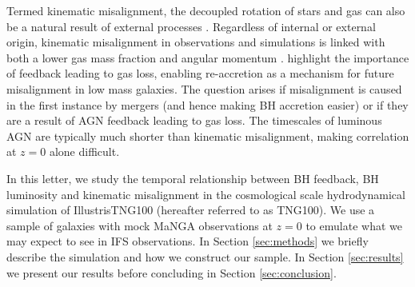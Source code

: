 \documentclass[fleqn,usenatbib]{mnras}
\newcommand{\red}[1]{{\textcolor{red}{#1}}}
\begin{document}
Termed kinematic misalignment, the decoupled rotation of stars and gas can also be a natural result of external processes \cite[e.g.][]{davis2011, barrera2015, vdvoort2015, jin2016, bryant2019, duckworth2019_halo}. Regardless of internal or external origin, kinematic misalignment in observations and simulations is linked with both a lower gas mass fraction and angular momentum \citep[][]{duckworth2019}. \citet{starkenburg+19} highlight the importance of feedback leading to gas loss, enabling re-accretion as a mechanism for future misalignment in low mass galaxies. The question arises if misalignment is caused in the first instance by mergers (and hence making BH accretion easier) or if they are a result of AGN feedback leading to gas loss. 
The timescales of luminous AGN are typically much shorter than kinematic misalignment, making correlation at $z=0$ alone difficult. 

In this letter, we study the temporal relationship between BH feedback, BH luminosity and kinematic misalignment in the cosmological scale hydrodynamical simulation of IllustrisTNG100 (hereafter referred to as TNG100). We use a sample of galaxies with mock MaNGA \citep[Mapping Galaxies at Apache Point;][]{bundy2015, blanton2017} observations at $z=0$ to emulate what we may expect to see in IFS observations. In Section \ref{sec:methods} we briefly describe the simulation and how we construct our sample. In Section \ref{sec:results} we present our results before concluding in Section \ref{sec:conclusion}.
\end{document}
